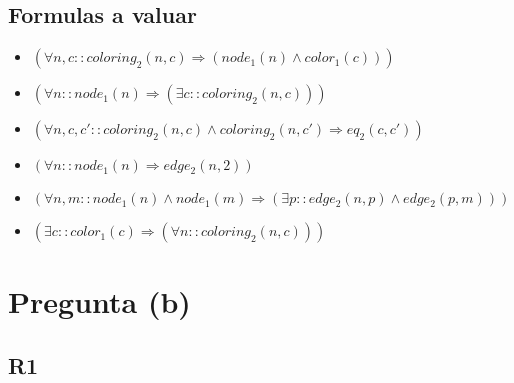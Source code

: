 \documentclass[a4paper,11pt]{article}
\begin{document}
\subsection{Formulas a valuar}
\begin{itemize}
    \item $(\forall n, c :: coloring_2(n, c) \Rightarrow (node_1(n) \land color_1(c)))$
    \item $(\forall n :: node_1(n) \Rightarrow (\exists c :: coloring_2(n, c)))$
    \item $(\forall n, c, c' :: coloring_2(n, c) \land coloring_2(n, c') \Rightarrow eq_2(c, c'))$
    \item $(\forall n :: node_1(n) \Rightarrow edge_2(n, 2))$
    \item $(\forall n, m :: node_1(n) \land node_1(m) \Rightarrow (\exists p :: edge_2(n, p) \land edge_2(p, m)))$
    \item $(\exists c :: color_1(c) \Rightarrow (\forall n :: coloring_2(n, c)))$
\end{itemize}

\newpage
\section{Pregunta (b)}
\subsection{R1}
\end{document}
